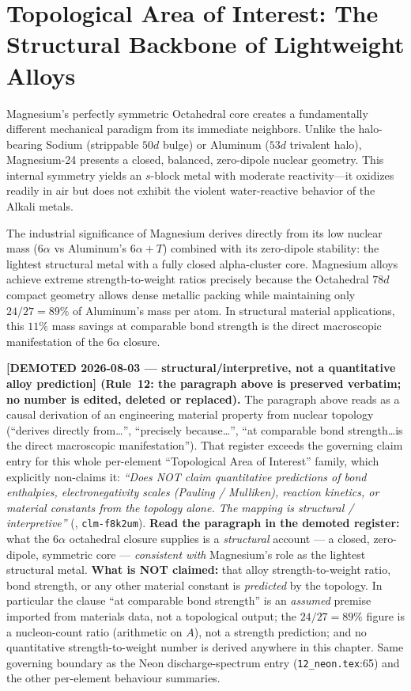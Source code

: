 \section{Topological Area of Interest: The Structural Backbone of Lightweight Alloys}
Magnesium's perfectly symmetric Octahedral core creates a fundamentally different mechanical paradigm from its immediate neighbors. Unlike the halo-bearing Sodium (strippable $50d$ bulge) or Aluminum ($53d$ trivalent halo), Magnesium-24 presents a closed, balanced, zero-dipole nuclear geometry. This internal symmetry yields an $s$-block metal with moderate reactivity---it oxidizes readily in air but does not exhibit the violent water-reactive behavior of the Alkali metals.

The industrial significance of Magnesium derives directly from its low nuclear mass ($6\alpha$ vs Aluminum's $6\alpha + T$) combined with its zero-dipole stability: the lightest structural metal with a fully closed alpha-cluster core. Magnesium alloys achieve extreme strength-to-weight ratios precisely because the Octahedral $78d$ compact geometry allows dense metallic packing while maintaining only $24/27 = 89\%$ of Aluminum's mass per atom. In structural material applications, this $11\%$ mass savings at comparable bond strength is the direct macroscopic manifestation of the $6\alpha$ closure.

\noindent\textbf{[DEMOTED 2026-08-03 --- structural/interpretive, not a quantitative alloy prediction] (Rule~12: the paragraph above is preserved verbatim; no number is edited, deleted or replaced).} The paragraph above reads as a causal derivation of an engineering material property from nuclear topology (``derives directly from\ldots'', ``precisely because\ldots'', ``at comparable bond strength\ldots is the direct macroscopic manifestation''). That register exceeds the governing claim entry for this whole per-element ``Topological Area of Interest'' family, which explicitly non-claims it: \emph{``Does NOT claim quantitative predictions of bond enthalpies, electronegativity scales (Pauling / Mulliken), reaction kinetics, or material constants from the topology alone. The mapping is structural / interpretive''} (, \texttt{clm-f8k2um}). \textbf{Read the paragraph in the demoted register:} what the $6\alpha$ octahedral closure supplies is a \emph{structural} account --- a closed, zero-dipole, symmetric core --- \emph{consistent with} Magnesium's role as the lightest structural metal. \textbf{What is NOT claimed:} that alloy strength-to-weight ratio, bond strength, or any other material constant is \emph{predicted} by the topology. In particular the clause ``at comparable bond strength'' is an \emph{assumed} premise imported from materials data, not a topological output; the $24/27 = 89\%$ figure is a nucleon-count ratio (arithmetic on $A$), not a strength prediction; and no quantitative strength-to-weight number is derived anywhere in this chapter. Same governing boundary as the Neon discharge-spectrum entry (\texttt{12\_neon.tex}:65) and the other per-element behaviour summaries.

